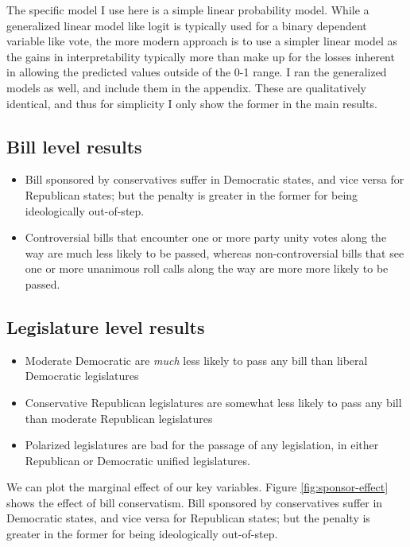 \documentclass[
  oneside]{book}
\providecommand{\tightlist}{%
  \setlength{\itemsep}{0pt}\setlength{\parskip}{0pt}}
\begin{document}
The specific model I use here is a simple linear probability model. While a generalized linear model like logit is typically used for a binary dependent variable like vote, the more modern approach is to use a simpler linear model as the gains in interpretability typically more than make up for the losses inherent in allowing the predicted values outside of the 0-1 range. I ran the generalized models as well, and include them in the appendix. These are qualitatively identical, and thus for simplicity I only show the former in the main results.

\hypertarget{bill-level-results}{%
\subsection{Bill level results}\label{bill-level-results}}

\begin{itemize}
\tightlist
\item
  Bill sponsored by conservatives suffer in Democratic states, and vice versa for Republican states; but the penalty is greater in the former for being ideologically out-of-step.
\item
  Controversial bills that encounter one or more party unity votes along the way are much less likely to be passed, whereas non-controversial bills that see one or more unanimous roll calls along the way are more more likely to be passed.
\end{itemize}

\hypertarget{legislature-level-results}{%
\subsection{Legislature level results}\label{legislature-level-results}}

\begin{itemize}
\tightlist
\item
  Moderate Democratic are \emph{much} less likely to pass any bill than liberal Democratic legislatures
\item
  Conservative Republican legislatures are somewhat less likely to pass any bill than moderate Republican legislatures
\item
  Polarized legislatures are bad for the passage of any legislation, in either Republican or Democratic unified legislatures.
\end{itemize}

We can plot the marginal effect of our key variables. Figure \ref{fig:sponsor-effect} shows the effect of bill conservatism. Bill sponsored by conservatives suffer in Democratic states, and vice versa for Republican states; but the penalty is greater in the former for being ideologically out-of-step.
\end{document}
